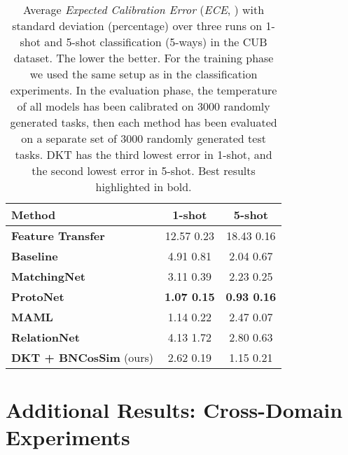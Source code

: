 \documentclass{article}
\begin{document}
\begin{table}[H]
\caption{Average \emph{Expected Calibration Error} (\emph{ECE}, \citealt{guo2017calibration}) with standard deviation (percentage) over three runs on 1-shot and 5-shot classification (5-ways) in the CUB dataset. The lower the better. For the training phase we used the same setup as in the classification experiments. In the evaluation phase, the temperature of all models has been calibrated on 3000 randomly generated tasks, then each method has been evaluated on a separate set of 3000 randomly generated test tasks. DKT has the third lowest error in 1-shot, and the second lowest error in 5-shot. Best results highlighted in bold.}
\centering
\begin{tabular}{lcc}
\hline
\small{\textbf{Method}} & \textbf{1-shot}& \textbf{5-shot} \\ 
\hline
\small{\textbf{Feature Transfer}} & 12.57  \small{0.23} & 18.43  \small{0.16} \\
\small{\textbf{Baseline}} \citep{chen2019closerfewshot} & 4.91  \small{0.81} & 2.04  \small{0.67} \\
\small{\textbf{MatchingNet}} \citep{vinyals2016matching} & 3.11  \small{0.39} & 2.23  \small{0.25}  \\
\small{\textbf{ProtoNet}} \citep{snell2017prototypical} & \textbf{1.07  \small{0.15}} & \textbf{0.93  \small{0.16}}  \\
\small{\textbf{MAML}}  \citep{finn2017model} & 1.14  \small{0.22} & 2.47  \small{0.07}  \\
\small{\textbf{RelationNet}} \citep{sung2018learning} & 4.13  \small{1.72} & 2.80  \small{0.63}  \\
\hline
\small{\textbf{DKT + BNCosSim}} (ours) & 2.62  \small{0.19} & 1.15  \small{0.21}  \\
\hline
\end{tabular}
\label{tab_uncertainty_ece}
\end{table}

\section{Additional Results: Cross-Domain Experiments}
\label{sec:appendix_results_crossdomain}
\end{document}
